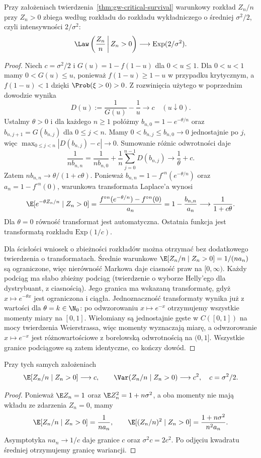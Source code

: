 \begin{twierdzenie}
\label{thm:gw-yaglom}
Przy założeniach twierdzenia~\ref{thm:gw-critical-survival}
warunkowy rozkład $Z_n/n$ przy $Z_n>0$ zbiega
według rozkładu do rozkładu wykładniczego
o średniej $\sigma^2/2$, czyli intensywności
$2/\sigma^2$:
\[
\Law\left(\frac{Z_n}{n}\,\middle|\,Z_n>0\right)
\longrightarrow\mathrm{Exp}(2/\sigma^2).
\]
\end{twierdzenie}
\begin{proof}
Niech $c=\sigma^2/2$ i
$G(u)=1-f(1-u)$ dla $0<u\le1$.
Dla $0<u<1$ mamy $0<G(u)\le u$,
ponieważ $f(1-u)\ge1-u$ w przypadku krytycznym,
a $f(1-u)<1$ dzięki $\Prob(\xi>0)>0$.
Z rozwinięcia użytego w poprzednim dowodzie
wynika
\[
D(u):=\frac1{G(u)}-\frac1u\longrightarrow c
\quad(u\downarrow0).
\]
Ustalmy $\theta>0$ i dla każdego $n\ge1$ połóżmy
$b_{n,0}=1-e^{-\theta/n}$ oraz
$b_{n,j+1}=G(b_{n,j})$ dla $0\le j<n$.
Mamy $0<b_{n,j}\le b_{n,0}\to0$ jednostajnie po $j$,
więc $\max_{0\le j<n}|D(b_{n,j})-c|\to0$.
Sumowanie różnic odwrotności daje
\[
\frac1{n b_{n,n}}
=\frac1{n b_{n,0}}+
\frac1n\sum_{j=0}^{n-1}D(b_{n,j})
\longrightarrow \frac1\theta+c .
\]
Zatem $n b_{n,n}\to\theta/(1+c\theta)$.
Ponieważ $b_{n,n}=1-f^{\circ n}(e^{-\theta/n})$
oraz $a_n=1-f^{\circ n}(0)$,
warunkowa transformata Laplace'a wynosi
\[
\E[e^{-\theta Z_n/n}\mid Z_n>0]
=\frac{f^{\circ n}(e^{-\theta/n})-f^{\circ n}(0)}
{a_n}
=1-\frac{b_{n,n}}{a_n}
\longrightarrow \frac1{1+c\theta}.
\]
Dla $\theta=0$ równość transformat jest automatyczna.
Ostatnia funkcja jest transformatą rozkładu
$\mathrm{Exp}(1/c)$.

Dla ścisłości wniosek o zbieżności rozkładów
można otrzymać bez dodatkowego twierdzenia
o transformatach. Średnie warunkowe
$\E[Z_n/n\mid Z_n>0]=1/(na_n)$ są ograniczone,
więc nierówność Markowa daje ciasność praw
na $[0,\infty)$. Każdy podciąg ma słabo zbieżny
podciąg (twierdzenie o wyborze Helly'ego dla
dystrybuant, z ciasnością). Jego granica ma
wskazaną transformatę, gdyż $x\mapsto e^{-\theta x}$
jest ograniczona i ciągła.
Jednoznaczność transformaty wynika już z wartości
dla $\theta=k\in\N_0$: po odwzorowaniu $x\mapsto e^{-x}$
otrzymujemy wszystkie momenty miary na $[0,1]$.
Wielomiany są jednostajnie gęste w $C([0,1])$
na mocy twierdzenia Weierstrassa, więc momenty
wyznaczają miarę, a odwzorowanie $x\mapsto e^{-x}$
jest różnowartościowe z borelowską odwrotnością
na $(0,1]$. Wszystkie granice podciągowe są
zatem identyczne, co kończy dowód.
\end{proof}

\begin{wniosek}
Przy tych samych założeniach
\[
\E[Z_n/n\mid Z_n>0]\longrightarrow c,\qquad
\Var(Z_n/n\mid Z_n>0)\longrightarrow c^2,
\quad c=\sigma^2/2.
\]
\end{wniosek}
\begin{proof}
Ponieważ $\E Z_n=1$ oraz $\E Z_n^2=1+n\sigma^2$,
a oba momenty nie mają wkładu ze zdarzenia $Z_n=0$,
mamy
\[
\E[Z_n/n\mid Z_n>0]=\frac1{na_n},\qquad
\E[(Z_n/n)^2\mid Z_n>0]=\frac{1+n\sigma^2}{n^2a_n}.
\]
Asymptotyka $na_n\to1/c$ daje granice $c$ oraz
$\sigma^2c=2c^2$. Po odjęciu kwadratu średniej
otrzymujemy granicę wariancji.
\end{proof}

